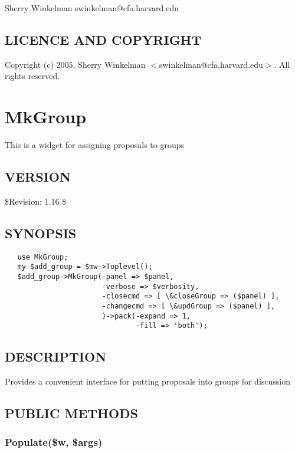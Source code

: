 \documentclass{article}
\begin{document}
Sherry Winkelman swinkelman@cfa.harvard.edu

\subsection*{LICENCE AND COPYRIGHT\label{EditPage_LICENCE_AND_COPYRIGHT}}


Copyright (c) 2005, Sherry Winkelman $<$swinkelman@cfa.harvard.edu$>$. All rights 
reserved.

\clearpage
\section{MkGroup\label{MkGroup}}


This is a widget for assigning proposals to groups

\subsection*{VERSION\label{MkGroup_VERSION}}


\$Revision: 1.16 \$

\subsection*{SYNOPSIS\label{MkGroup_SYNOPSIS}}
\begin{verbatim}
   use MkGroup;
   my $add_group = $mw->Toplevel();
   $add_group->MkGroup(-panel => $panel,
                       -verbose => $verbosity,
                       -closecmd => [ \&closeGroup => ($panel) ],
                       -changecmd => [ \&updGroup => ($panel) ],
                       )->pack(-expand => 1,
                               -fill => 'both');
\end{verbatim}
\subsection*{DESCRIPTION\label{MkGroup_DESCRIPTION}}


Provides a convenient interface for putting proposals into groups for 
discussion

\subsection*{PUBLIC METHODS\label{MkGroup_PUBLIC_METHODS}}
\subsubsection*{Populate(\$w, \$args)\label{MkGroup_Populate_w_args_}}
\end{document}
